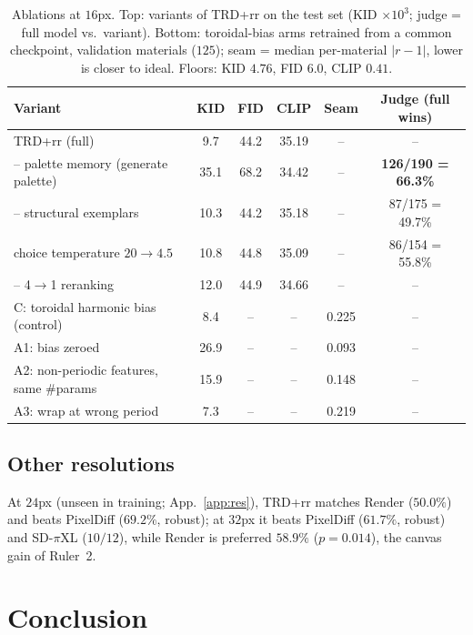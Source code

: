 \documentclass{article}
\newcommand{\trd}{\textsc{TRD}}
\begin{document}
\begin{table}[t]
\caption{Ablations at $16$px. Top: variants of \trd{}+rr on the test set
(KID $\times10^3$; judge = full model vs.\ variant). Bottom: toroidal-bias
arms retrained from a common checkpoint, validation materials ($125$); seam = median
per-material $|r-1|$, lower is closer to ideal. Floors: KID $4.76$, FID $6.0$,
CLIP $0.41$.}
\label{tab:ablation}
\centering
\small
\begin{tabular}{@{}lccccc@{}}
\toprule
Variant & KID & FID & CLIP & Seam & Judge (full wins) \\
\midrule
\trd{}+rr (full) & 9.7 & 44.2 & 35.19 & -- & -- \\
\;-- palette memory (generate palette) & 35.1 & 68.2 & 34.42 & -- & \textbf{126/190 = 66.3\%} \\
\;-- structural exemplars & 10.3 & 44.2 & 35.18 & -- & 87/175 = 49.7\% \\
\;choice temperature $20\to4.5$ & 10.8 & 44.8 & 35.09 & -- & 86/154 = 55.8\% \\
\;-- 4$\to$1 reranking & 12.0 & 44.9 & 34.66 & -- & -- \\
\midrule
C: toroidal harmonic bias (control) & 8.4 & -- & -- & 0.225 & -- \\
A1: bias zeroed & 26.9 & -- & -- & 0.093 & -- \\
A2: non-periodic features, same \#params & 15.9 & -- & -- & 0.148 & -- \\
A3: wrap at wrong period & 7.3 & -- & -- & 0.219 & -- \\
\bottomrule
\end{tabular}
\end{table}

\subsection{Other resolutions}
\label{sec:resolutions}

At $24$px (unseen in training; App.~\ref{app:res}), \trd{}+rr matches Render
($50.0\%$) and beats PixelDiff ($69.2\%$, robust); at $32$px it beats
PixelDiff ($61.7\%$, robust) and SD-$\pi$XL ($10/12$), while Render is
preferred $58.9\%$ ($p=0.014$), the canvas gain of Ruler~2.

\section{Conclusion}
\label{sec:conclusion}
\end{document}
